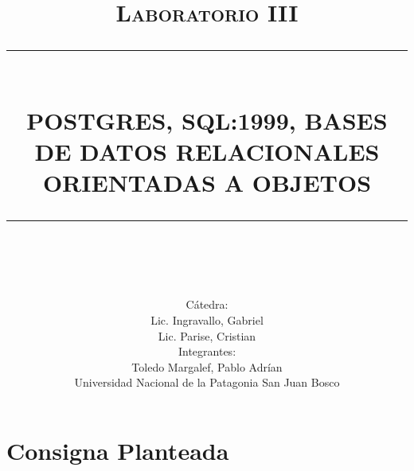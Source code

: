 \documentclass[12pt]{report}
\newcommand{\HRule}[1]{\rule{\linewidth}{#1}}
\begin{document}
\title{ \normalsize \textsc{Laboratorio III}
    \\ [2.0cm]
    \HRule{0.5pt} \\
    \LARGE \textbf{\uppercase{Postgres, sql:1999, Bases de Datos Relacionales Orientadas a Objetos}}
\HRule{2pt} \\ [0.5cm]}


\author{
    Cátedra: \\
    Lic. Ingravallo, Gabriel\\
    Lic. Parise, Cristian\\
    Integrantes: \\
    Toledo Margalef, Pablo Adrían \\ 
Universidad Nacional de la Patagonia San Juan Bosco}

\maketitle
\newpage

\sectionfont{\scshape}


\section*{Consigna Planteada}
\end{document}

